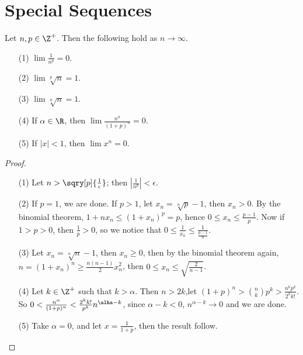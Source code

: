 
\section{Special Sequences}

\begin{theorem}\label{3.5.1}
    Let $n, p \in \Z^+$. Then the following hold as  $n \rightarrow \infty$.
        \begin{enumerate}
            \item[(1)] $\lim{\frac{1}{n^p}}=0$.

            \item[(2)] $\lim{\sqrt[p]{n}}=1$.

            \item[(3)] $\lim{\sqrt[n]{n}}=1$.

            \item[(4)] If $\alpha \in \R$, then  $\lim{\frac{n^{\alpha}}{(1+p)^n}}=0$.

            \item[(5)] If $|x|<1$, then  $\lim{x^n}=0$.
        \end{enumerate}
\end{theorem}
\begin{proof}
   \begin{enumerate}
       \item[(1)] Let $n>\sqry[p]{\frac{1}{\epsilon}}$; then $|\frac{1}{n^p}|<\epsilon$.

       \item[(2)] If $p=1$, we are done. If  $p>1$, let  $x_n=\sqrt[n]{p}-1$, then  $x_n>0$.
           By the binomial theorem, $1+nx_n \leq (1+x_n)^p=p$, hence $0 \leq x_n \leq \frac{p-1}{p}$.
           Now if $1>p>0$, then  $ \frac{1}{p}>0$, so we notice that $0 \leq \frac{1}{x_n} \leq \frac{1}{\frac{p-1}{n}}$.

       \item[(3)] Let $x_n=\sqrt[n]{n}-1$, then  $x_n \geq 0$, then by the binomial theorem again,
           $n=(1+x_n)^n \geq \frac{n(n-1)}{2}x_n^2$, then $0 \leq x_n \leq \sqrt{\frac{2}{n-1}}$.

       \item[(4)] Let $k \in \Z^+$ such that  $k>\alpha$. Then  $n>2k$,let  $(1+p)^n> {n \choose k}p^k>
           \frac{n^kp^k}{2^kk!}$. So $0<\frac{n^{\alpha}}{(1+p)^n}<\frac{2^kk!}{p^k}n^{\alha-k}$, since
           $\alpha-k<0$,  $n^{\alpha-k} \rightarrow 0$ and we are done.

       \item[(5)] Take  $\alpha=0$, and let  $x=\frac{1}{1+p}$, then the result follow.
   \end{enumerate}
\end{proof}
